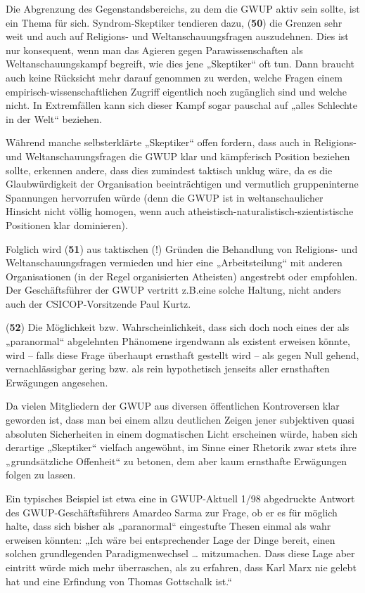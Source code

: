 Die Abgrenzung des Gegenstandsbereichs, zu dem die GWUP aktiv sein
sollte, ist ein Thema für sich. Syndrom-Skeptiker tendieren dazu,
(\textbf{50}) die Grenzen sehr weit und auch auf Religions- und
Weltanschauungsfragen auszudehnen. Dies ist nur konsequent, wenn man das
Agieren gegen Parawissenschaften als Weltanschauungskampf begreift, wie
dies jene „Skeptiker`` oft tun. Dann braucht auch keine Rücksicht mehr
darauf genommen zu werden, welche Fragen einem
empirisch-wissenschaftlichen Zugriff eigentlich noch zugänglich sind und
welche nicht. In Extremfällen kann sich dieser Kampf sogar pauschal auf
„alles Schlechte in der Welt`` beziehen.

Während manche selbsterklärte „Skeptiker`` offen fordern, dass auch in
Religions- und Weltanschauungsfragen die GWUP klar und kämpferisch
Position beziehen sollte, erkennen andere, dass dies zumindest taktisch
unklug wäre, da es die Glaubwürdigkeit der Organisation beeinträchtigen
und vermutlich gruppeninterne Spannungen hervorrufen würde (denn die
GWUP ist in weltanschaulicher Hinsicht nicht völlig homogen, wenn auch
atheistisch-naturalistisch-szientistische Positionen klar dominieren).

Folglich wird (\textbf{51}) aus taktischen (!) Gründen die Behandlung
von Religions- und Weltanschauungsfragen vermieden und hier eine
„Arbeitsteilung`` mit anderen Organisationen (in der Regel organisierten
Atheisten) angestrebt oder empfohlen. Der Geschäftsführer der GWUP
vertritt z.B.eine solche Haltung, nicht anders auch der
CSICOP-Vorsitzende Paul Kurtz.

(\textbf{52}) Die Möglichkeit bzw. Wahrscheinlichkeit, dass sich doch
noch eines der als „paranormal`` abgelehnten Phänomene irgendwann als
existent erweisen könnte, wird -- falls diese Frage überhaupt ernsthaft
gestellt wird -- als gegen Null gehend, vernachlässigbar gering bzw. als
rein hypothetisch jenseits aller ernsthaften Erwägungen angesehen.

Da vielen Mitgliedern der GWUP aus diversen öffentlichen Kontroversen
klar geworden ist, dass man bei einem allzu deutlichen Zeigen jener
subjektiven quasi absoluten Sicherheiten in einem dogmatischen Licht
erscheinen würde, haben sich derartige „Skeptiker`` vielfach angewöhnt,
im Sinne einer Rhetorik zwar stets ihre „grundsätzliche Offenheit`` zu
betonen, dem aber kaum ernsthafte Erwägungen folgen zu lassen.

Ein typisches Beispiel ist etwa eine in GWUP-Aktuell 1/98 abgedruckte
Antwort des GWUP-Geschäftsführers Amardeo Sarma zur Frage, ob er es für
möglich halte, dass sich bisher als „paranormal`` eingestufte Thesen
einmal als wahr erweisen könnten: „Ich wäre bei entsprechender Lage der
Dinge bereit, einen solchen grundlegenden Paradigmenwechsel \ldots{}
mitzumachen. Dass diese Lage aber eintritt würde mich mehr überraschen,
als zu erfahren, dass Karl Marx nie gelebt hat und eine Erfindung von
Thomas Gottschalk ist.``

